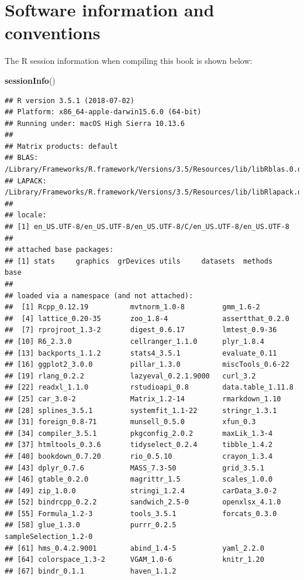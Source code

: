 \documentclass[]{book}
\newenvironment{Shaded}{\begin{snugshade}}{\end{snugshade}}
\newcommand{\KeywordTok}[1]{\textcolor[rgb]{0.13,0.29,0.53}{\textbf{#1}}}
\newcommand{\NormalTok}[1]{#1}
\begin{document}
\hypertarget{software-information-and-conventions}{%
\section*{Software information and
conventions}\label{software-information-and-conventions}}

The R session information when compiling this book is shown below:

\begin{Shaded}
\begin{Highlighting}[]
\KeywordTok{sessionInfo}\NormalTok{()}
\end{Highlighting}
\end{Shaded}

\begin{verbatim}
## R version 3.5.1 (2018-07-02)
## Platform: x86_64-apple-darwin15.6.0 (64-bit)
## Running under: macOS High Sierra 10.13.6
## 
## Matrix products: default
## BLAS: /Library/Frameworks/R.framework/Versions/3.5/Resources/lib/libRblas.0.dylib
## LAPACK: /Library/Frameworks/R.framework/Versions/3.5/Resources/lib/libRlapack.dylib
## 
## locale:
## [1] en_US.UTF-8/en_US.UTF-8/en_US.UTF-8/C/en_US.UTF-8/en_US.UTF-8
## 
## attached base packages:
## [1] stats     graphics  grDevices utils     datasets  methods   base     
## 
## loaded via a namespace (and not attached):
##  [1] Rcpp_0.12.19          mvtnorm_1.0-8         gmm_1.6-2            
##  [4] lattice_0.20-35       zoo_1.8-4             assertthat_0.2.0     
##  [7] rprojroot_1.3-2       digest_0.6.17         lmtest_0.9-36        
## [10] R6_2.3.0              cellranger_1.1.0      plyr_1.8.4           
## [13] backports_1.1.2       stats4_3.5.1          evaluate_0.11        
## [16] ggplot2_3.0.0         pillar_1.3.0          miscTools_0.6-22     
## [19] rlang_0.2.2           lazyeval_0.2.1.9000   curl_3.2             
## [22] readxl_1.1.0          rstudioapi_0.8        data.table_1.11.8    
## [25] car_3.0-2             Matrix_1.2-14         rmarkdown_1.10       
## [28] splines_3.5.1         systemfit_1.1-22      stringr_1.3.1        
## [31] foreign_0.8-71        munsell_0.5.0         xfun_0.3             
## [34] compiler_3.5.1        pkgconfig_2.0.2       maxLik_1.3-4         
## [37] htmltools_0.3.6       tidyselect_0.2.4      tibble_1.4.2         
## [40] bookdown_0.7.20       rio_0.5.10            crayon_1.3.4         
## [43] dplyr_0.7.6           MASS_7.3-50           grid_3.5.1           
## [46] gtable_0.2.0          magrittr_1.5          scales_1.0.0         
## [49] zip_1.0.0             stringi_1.2.4         carData_3.0-2        
## [52] bindrcpp_0.2.2        sandwich_2.5-0        openxlsx_4.1.0       
## [55] Formula_1.2-3         tools_3.5.1           forcats_0.3.0        
## [58] glue_1.3.0            purrr_0.2.5           sampleSelection_1.2-0
## [61] hms_0.4.2.9001        abind_1.4-5           yaml_2.2.0           
## [64] colorspace_1.3-2      VGAM_1.0-6            knitr_1.20           
## [67] bindr_0.1.1           haven_1.1.2
\end{verbatim}
\end{document}
